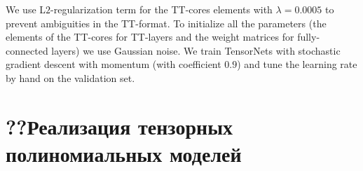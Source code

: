 
We use L$2$-regularization term for the TT-cores elements with $\lambda = 0.0005$ to prevent ambiguities in the TT-format. To initialize all the parameters (the elements of the TT-cores for TT-layers and the weight matrices for fully-connected layers) we use Gaussian noise. We train TensorNets with stochastic gradient descent with momentum (with coefficient $0.9$) and tune the learning rate by hand on the validation set.


\section{??Реализация тензорных полиномиальных моделей} \label{sec:nn-code}
